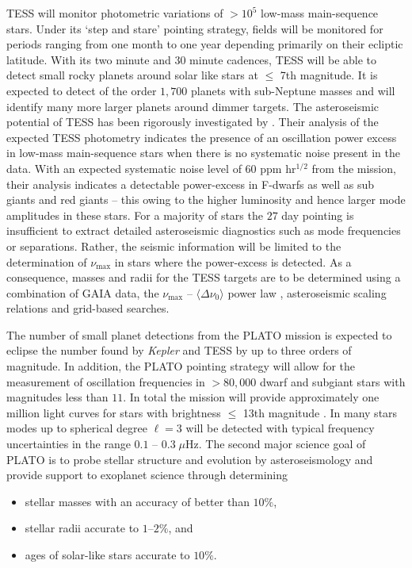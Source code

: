 TESS will monitor photometric variations of ${> 10^5}$ low-mass main-sequence stars. Under its `step and stare' pointing strategy, fields will be monitored for periods ranging from one month to one year depending primarily on their ecliptic latitude. With its two minute and $30$ minute cadences, TESS will be able to detect small rocky planets around solar like stars at $\le$ 7th magnitude. It is expected to detect of the order $1,700$ planets with sub-Neptune masses \citep{2016ApJ...830..138C} and will identify many more larger planets around dimmer targets.  The asteroseismic potential of TESS has been rigorously investigated by \citet{2016ApJ...830..138C}. Their analysis of the expected TESS photometry indicates the presence of an oscillation power excess 
in low-mass main-sequence stars when there is no systematic noise present in the data. With an expected systematic noise level of  $60$ ppm hr$^{1/2}$ from the mission, their analysis indicates a detectable power-excess in F-dwarfs as well as sub giants and red giants -- this owing to the higher luminosity and hence larger mode amplitudes in these stars. For a majority of stars the $27$ day pointing is insufficient to extract detailed asteroseismic diagnostics such as mode frequencies or separations. Rather, the seismic information will be limited to the determination of $\nu_{\max}$ in stars where the power-excess is detected. As a consequence, masses and radii for the TESS targets are to be determined using a combination of  GAIA data, the  $\nu_{\max}$ -- ${\langle\Delta\nu_0\rangle}$ power law \citep{2009A&A...506..465H,2009MNRAS.400L..80S} , asteroseismic scaling relations and grid-based searches.  
 

The number of small planet detections from the PLATO mission is expected to eclipse the number found by \emph{Kepler}
and TESS by up to three orders of magnitude. In addition, the PLATO pointing strategy will allow for the measurement of oscillation frequencies in $> 80,000$ dwarf and subgiant stars with magnitudes less than $11$.  In total the mission will provide approximately one million light curves for stars with brightness $\le$ 13th magnitude \citep{2014ExA....38..249R}. In many stars modes up to spherical degree ${\ell =3}$ will be detected with typical frequency uncertainties in the range  $0.1$ -- $0.3\;\mu$Hz. The second major science goal of PLATO is to 
probe stellar structure and evolution by asteroseismology and provide support to exoplanet science through determining
\begin{itemize}
\item stellar masses with an accuracy of better than  $10\%$,
\item stellar radii accurate to $1$--$2\%$, and
\item ages of solar-like stars accurate to  $10\%$.
\end{itemize}

